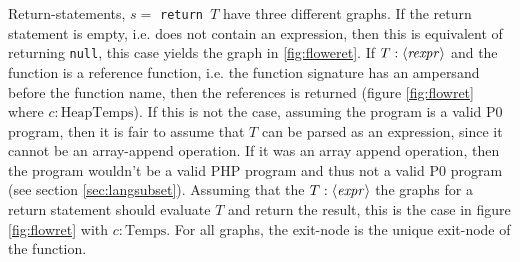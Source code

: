 \begin{figure}
{\begin{adjustbox}{max size={.25\textwidth}{.25\textheight}}
\end{adjustbox}}\hfill%
\hspace*{\fill}
\end{figure}

Return-statements, $s =$ \texttt{return $T$} have three different graphs. If the return statement is empty, i.e. does not contain an expression, then this is equivalent of returning \texttt{null}, this case yields the graph in \ref{fig:floweret}. If $T : \langle\mathit{rexpr}\rangle$ and the function is a reference function, i.e. the function signature has an ampersand before the function name, then the references is returned (figure \ref{fig:flowret} where $c : \text{HeapTemps}$). If this is not the case, assuming the program is a valid P0 program, then it is fair to assume that $T$ can be parsed as an expression, since it cannot be an array-append operation. If it was an array append operation, then the program wouldn't be a valid PHP program and thus not a valid P0 program (see section \ref{sec:langsubset}). Assuming that the $T : \langle\mathit{expr}\rangle$ the graphs for a return statement should evaluate $T$ and return the result, this is the case in figure \ref{fig:flowret} with $c : \text{Temps}$.  For all graphs, the exit-node is the unique exit-node of the function.

